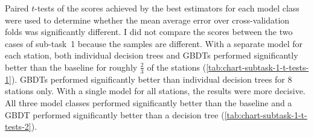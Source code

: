 \documentclass[11pt]{extarticle}
\begin{document}
Paired $t$-tests of the scores achieved by the best estimators for each model class
were used to determine whether the mean average error over cross-validation folds was
significantly different.
I did not compare the scores between the two cases of sub-task~1 because the samples
are different.
With a separate model for each station, both individual decision trees and GBDTs
performed significantly better than the baseline for roughly $\frac{2}{3}$ of the
stations (\cref{tab:chart-subtask-1-t-tests-1}).
GBDTs performed significantly better than individual decision trees for $8$ stations
only.
With a single model for all stations, the results were more decisive.
All three model classes performed significantly better than the baseline and a GBDT
performed significantly better than a decision tree
(\cref{tab:chart-subtask-1-t-tests-2}).
\end{document}
